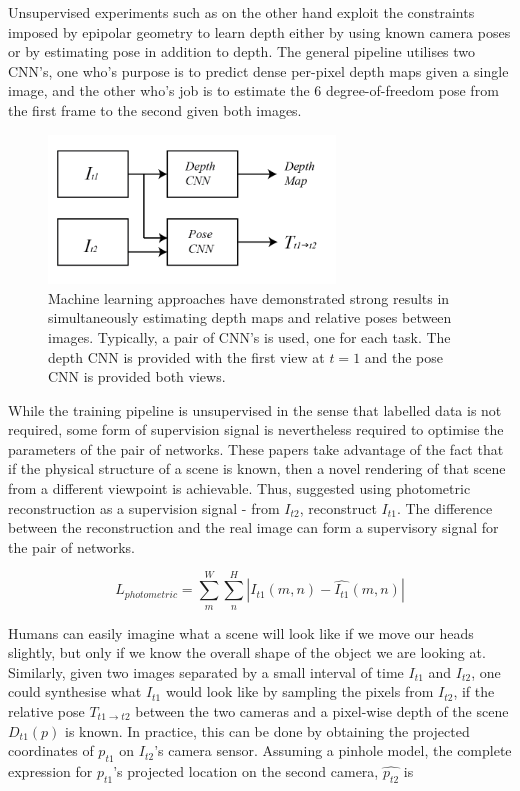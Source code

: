 \documentclass[openany]{book}
\begin{document}
Unsupervised experiments such as \cite{garg2016unsupervised, godard2016consistency,zhou2017unsupervised} on the other hand exploit the constraints imposed by epipolar geometry to learn depth either by using known camera poses or by estimating pose in addition to depth. The general pipeline utilises two CNN's, one who's purpose is to predict dense per-pixel depth maps given a single image, and the other who's job is to estimate the 6 degree-of-freedom pose from the first frame to the second given both images.

\begin{figure}[htbp]
    \centering
    \includegraphics[width=3in]{images/cnns.png}
    \caption{Machine learning approaches have demonstrated strong results in simultaneously estimating depth maps and relative poses between images. Typically, a pair of CNN's is used, one for each task. The depth CNN is provided with the first view at $t=1$ and the pose CNN is provided both views.}
    \label{2cnns}
\end{figure}


While the training pipeline is unsupervised in the sense that labelled data is not required, some form of supervision signal is nevertheless required to optimise the parameters of the pair of networks. These papers take advantage of the fact that if the physical structure of a scene is known, then a novel rendering of that scene from a different viewpoint is achievable. Thus, \cite{garg2016unsupervised} suggested using photometric reconstruction as a supervision signal - from $I_{t2}$, reconstruct $I_{t1}$. The difference between the reconstruction and the real image can form a supervisory signal for the pair of networks. 


\begin{equation}
    L_{photometric} = \sum_m^W \sum_n^H |I_{t1}(m,n) - \hat{I_{t1}}(m,n)|
\end{equation}


Humans can easily imagine what a scene will look like if we move our heads slightly, but only if we know the overall shape of the object we are looking at. Similarly, given two images separated by a small interval of time $I_{t1}$ and $I_{t2}$, one could synthesise what $I_{t1}$ would look like by sampling the pixels from $I_{t2}$, if the relative pose $T_{t1\rightarrow t2}$ between the two cameras and a pixel-wise depth of the scene $D_{t1}(p)$ is known. In practice, this can be done by obtaining the projected coordinates of $p_{t1}$ on $I_{t2}$'s camera sensor. Assuming a pinhole model, the complete expression for $p_{t1}$'s projected location on the second camera, $\hat{p_{t2}}$ is 
\end{document}
